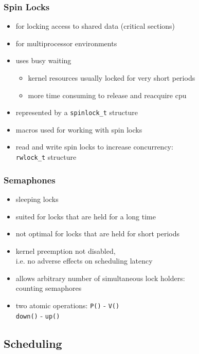 \documentclass[dvipsnames]{beamer}
\begin{document}
\begin{frame}
  \frametitle{Spin Locks}

  \begin{itemize}
    \item for locking access to shared data (critical sections)
    \item for multiprocessor environments
    \item uses busy waiting
    \begin{itemize}
      \item kernel resources usually locked for very short periods
      \item more time consuming to release and reacquire cpu
    \end{itemize}

    \medskip
    \item represented by a \lstinline|spinlock_t| structure
    \item macros used for working with spin locks
    \item read and write spin locks to increase concurrency:\\
      \lstinline|rwlock_t| structure
  \end{itemize}
\end{frame}

\begin{frame}
  \frametitle{Semaphones}

  \begin{itemize}
    \item sleeping locks
    \item suited for locks that are held for a long time
    \item not optimal for locks that are held for short periods

    \medskip
    \item kernel preemption not disabled,\\
      i.e. no adverse effects on scheduling latency
    \item allows arbitrary number of simultaneous lock holders:\\
      counting semaphores

    \medskip
    \item two atomic operations: \lstinline{P()} - \lstinline{V()}\\
      \lstinline{down()} - \lstinline{up()}
  \end{itemize}
\end{frame}

\subsection{Scheduling}
\end{document}
